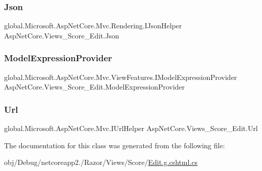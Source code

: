 \subsubsection{\texorpdfstring{Json}{Json}}
{\footnotesize\ttfamily global.\+Microsoft.\+Asp\+Net\+Core.\+Mvc.\+Rendering.\+I\+Json\+Helper Asp\+Net\+Core.\+Views\+\_\+\+Score\+\_\+\+Edit.\+Json\hspace{0.3cm}{\ttfamily [get]}}

\mbox{\label{class_asp_net_core_1_1_views___score___edit_ab83b7036dc1eae14f58de70d00e8093d}} 
\subsubsection{\texorpdfstring{ModelExpressionProvider}{ModelExpressionProvider}}
{\footnotesize\ttfamily global.\+Microsoft.\+Asp\+Net\+Core.\+Mvc.\+View\+Features.\+I\+Model\+Expression\+Provider Asp\+Net\+Core.\+Views\+\_\+\+Score\+\_\+\+Edit.\+Model\+Expression\+Provider\hspace{0.3cm}{\ttfamily [get]}}

\mbox{\label{class_asp_net_core_1_1_views___score___edit_a847e16dce2833b297f9bad496965e5e3}} 
\subsubsection{\texorpdfstring{Url}{Url}}
{\footnotesize\ttfamily global.\+Microsoft.\+Asp\+Net\+Core.\+Mvc.\+I\+Url\+Helper Asp\+Net\+Core.\+Views\+\_\+\+Score\+\_\+\+Edit.\+Url\hspace{0.3cm}{\ttfamily [get]}}



The documentation for this class was generated from the following file\+:\begin{DoxyCompactItemize}
\item 
obj/\+Debug/netcoreapp2./\+Razor/\+Views/\+Score/\mbox{\hyperlink{_edit_8g_8cshtml_8cs}{Edit.\+g.\+cshtml.\+cs}}\end{DoxyCompactItemize}
